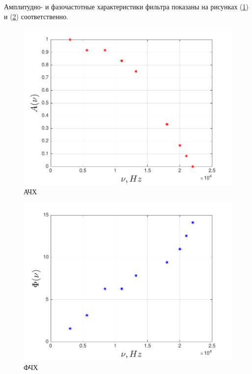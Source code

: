 Амплитудно- и фазочастотные характеристики фильтра показаны на рисунках (\ref{fig:figure1}) и (\ref{fig:figure2}) соответственно.
\begin{figure}[h!]
	\centering
	\includegraphics[]{graph/graph1}
	\caption{АЧХ}
	\label{fig:figure1}
\end{figure}

\begin{figure}[h!]
	\centering
	\includegraphics[]{graph/graph2}
	\caption{ФЧХ}
	\label{fig:figure2}
\end{figure}

